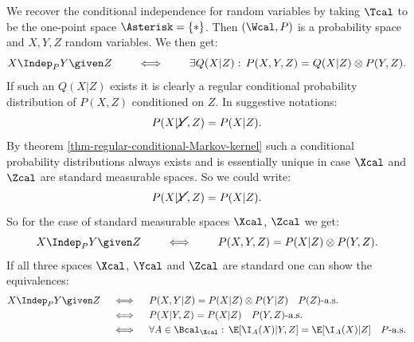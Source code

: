 \begin{Rem}
    \label{ci-random-variables}
We recover the conditional independence for random variables by taking $\Tcal$ to be the one-point space $\Asterisk =\{\ast\}$.
Then $(\Wcal, P)$ is a probability space and $X,Y,Z$ random variables. We then get:
\[ X \Indep_{P} Y \given Z \qquad \iff \qquad \exists Q(X|Z):\, P(X,Y,Z) = Q(X|Z) \otimes P(Y,Z).\]
If such an $Q(X|Z)$ exists it is clearly a regular conditional probability distribution of $P(X,Z)$ conditioned on $Z$.
In suggestive notations:
\[P(X|\cancel{Y},Z) = P(X|Z).\]
By theorem \ref{thm-regular-conditional-Markov-kernel} such a conditional probability distributions
always exists and is essentially unique in case $\Xcal$ and $\Zcal$ are standard measurable spaces.
So we could write:
\[P(X|\cancel{Y},Z) = P(X|Z).\]
So for the case of standard measurable spaces $\Xcal$, $\Zcal$ we get:
\[ X \Indep_{P} Y \given Z \qquad \iff \qquad  P(X,Y,Z) = P(X|Z) \otimes P(Y,Z).\]
If all three spaces $\Xcal$, $\Ycal$ and $\Zcal$ are standard one can show the equivalences:
\begin{align*}
    X \Indep_{P} Y \given Z \quad & \iff \quad  P(X,Y|Z) = P(X|Z) \otimes P(Y|Z) \quad P(Z)\text {-a.s.}\\
    & \iff \quad P(X|Y,Z) = P(X|Z)  \quad P(Y,Z)\text {-a.s.}\\
    & \iff \quad \forall A \in \Bcal_\Xcal:\, \E[\I_A(X)|Y,Z] = \E[\I_A(X)|Z]\quad P\text{-a.s.}
\end{align*}
\end{Rem}



